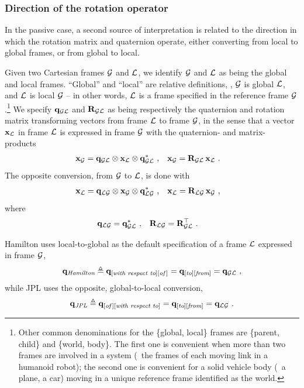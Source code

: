 \subsubsection{Direction of the rotation operator}

In the passive case, a second source of interpretation is related to the direction in which the rotation matrix and quaternion operate, 
either converting from local to global frames, or from global to local. 

Given two Cartesian frames $\mathcal{G}$ and $\mathcal{L}$, we identify $\mathcal{G}$ and $\mathcal{L}$ as being the global and local frames.
``Global'' and ``local'' are relative definitions, \ie, $\mathcal{G}$ is global \wrt $\mathcal{L}$, and $\mathcal{L}$ is local \wrt $\mathcal{G}$ -- in other words, $\mathcal{L}$ is a frame specified in the reference frame $\mathcal{G}$.\footnote{Other common denominations for the \{global, local\} frames are \{parent, child\} and \{world, body\}. The first one is convenient when more than two frames are involved in a system (\eg~the frames of each moving link in a humanoid robot); the second one is convenient for a solid vehicle body (\eg~a plane, a car) moving in a unique reference frame identified as the world.} 
We specify ${\bf q}_{\mathcal{G}\mathcal{L}}$ and ${\bf R}_{\mathcal{G}\mathcal{L}}$ as being respectively the quaternion and rotation matrix transforming vectors from frame $\mathcal{L}$ to frame $\mathcal{G}$, 
in the sense that a vector ${\bf x}_{\mathcal{L}}$ in frame $\mathcal{L}$ is expressed in frame $\mathcal{G}$ with the quaternion- and matrix- products
%
\begin{align}
{\bf x}_{\mathcal{G}} &= {\bf q}_{\mathcal{G}\mathcal{L}}\otimes{\bf x}_{\mathcal{L}}\otimes{\bf q}_{\mathcal{G}\mathcal{L}}^*~, &
{\bf x}_{\mathcal{G}} &= {\bf R}_{\mathcal{G}\mathcal{L}}\,{\bf x}_{\mathcal{L}}~.
\label{equ:local_to_global}
\end{align}
%
The opposite conversion, from $\mathcal{G}$ to $\mathcal{L}$, is done with
%
\begin{align}
{\bf x}_{\mathcal{L}} &= {\bf q}_{\mathcal{L}\mathcal{G}}\otimes{\bf x}_{\mathcal{G}}\otimes{\bf q}_{\mathcal{L}\mathcal{G}}^*
~,
&
{\bf x}_{\mathcal{L}} &= {\bf R}_{\mathcal{L}\mathcal{G}}\,{\bf x}_{\mathcal{G}}~,
\end{align}
%
where
%
\begin{align}
{\bf q}_{\mathcal{L}\mathcal{G}} &= {\bf q}_{\mathcal{G}\mathcal{L}}^*~,
& 
{\bf R}_{\mathcal{L}\mathcal{G}} &= {\bf R}_{\mathcal{G}\mathcal{L}}^{\top}~. \label{equ:localVsGlobal}
\end{align}


Hamilton uses local-to-global as the default specification of a frame $\mathcal{L}$ expressed in frame $\mathcal{G}$, 
%
\begin{align}
{\bf q}_{\textit{Hamilton}} \triangleq {\bf q}_{[\textit{with~respect~to}][\textit{of\,}]}={\bf q}_{[\textit{to}][\textit{from}]}={\bf q}_{\mathcal{G}\mathcal{L}}~, 
\end{align}
%
while JPL uses the opposite, global-to-local conversion,
%
\begin{align}
{\bf q}_{\textit{JPL}} \triangleq {\bf q}_{[\textit{of}\,][\textit{with~respect~to}]}={\bf q}_{[\textit{to}][\textit{from}]}={\bf q}_{\mathcal{L}\mathcal{G}}~.
\end{align}

